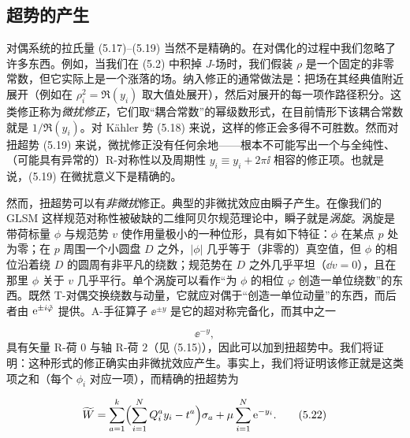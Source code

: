 
\subsection{超势的产生}

对偶系统的拉氏量 (5.17)–(5.19) 当然不是精确的。在对偶化的过程中我们忽略了许多东西。例如，当我们在 (5.2) 中积掉 $J$-场时，我们假装 $\rho$ 是一个固定的非零常数，但它实际上是一个涨落的场。纳入修正的通常做法是：把场在其经典值附近展开（例如在 $\rho_i^2=\Re(y_i)$ 取大值处展开），然后对展开的每一项作路径积分。这类修正称为\emph{微扰修正}，它们取“耦合常数”的幂级数形式，在目前情形下该耦合常数就是 $1/\Re(y_i)$。对 Kähler 势 (5.18) 来说，这样的修正会多得不可胜数。然而对扭超势 (5.19) 来说，微扰修正没有任何余地——根本不可能写出一个与全纯性、（可能具有异常的）R-对称性以及周期性 $y_i\equiv y_i+2\pi\ii$ 相容的修正项。也就是说，(5.19) 在微扰意义下是精确的。

然而，扭超势可以有\emph{非微扰}修正。典型的非微扰效应由瞬子产生。在像我们的 GLSM 这样规范对称性被破缺的二维阿贝尔规范理论中，瞬子就是\emph{涡旋}。涡旋是带荷标量 $\phi$ 与规范势 $v$ 使作用量极小的一种位形，具有如下特征：$\phi$ 在某点 $p$ 处为零；在 $p$ 周围一个小圆盘 $D$ 之外，$|\phi|$ 几乎等于（非零的）真空值，但 $\phi$ 的相位沿着绕 $D$ 的圆周有非平凡的绕数；规范势在 $D$ 之外几乎平坦（$\dd v=0$），且在那里 $\phi$ 关于 $v$ 几乎平行。单个涡旋可以看作“为 $\phi$ 的相位 $\varphi$ 创造一单位绕数”的东西。既然 T-对偶交换绕数与动量，它就应对偶于“创造一单位动量”的东西，而后者由 $\mathrm{e}^{\pm i\tilde\varphi}$ 提供。A-手征算子 $\ee^{\pm y}$ 是它的超对称完备化，而其中之一

\begin{equation}
    \ee^{-y},
    \tag{5.21}
\end{equation}
具有矢量 R-荷 $0$ 与轴 R-荷 $2$（见 (5.15)），因此可以加到扭超势中。我们将证明：这种形式的修正确实由非微扰效应产生。事实上，我们将证明该修正就是这类项之和（每个 $\phi_i$ 对应一项），而精确的扭超势为

\begin{equation}
    \widetilde{W}=\sum_{a=1}^{k}\Bigl(\sum_{i=1}^{N}Q_i^a y_i-t^a\Bigr)\sigma_a+\mu\sum_{i=1}^{N}\mathrm{e}^{-y_i}.
    \tag{5.22}
\end{equation}



